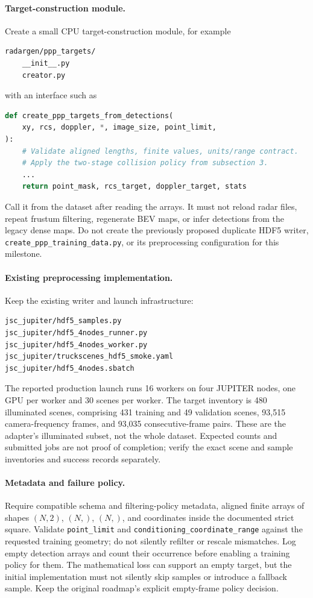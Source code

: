 \documentclass[11pt,a4paper]{article}
\begin{document}
\paragraph{Target-construction module.}
Create a small CPU target-construction module, for example
\begin{lstlisting}
radargen/ppp_targets/
    __init__.py
    creator.py
\end{lstlisting}
with an interface such as
\begin{lstlisting}[language=Python]
def create_ppp_targets_from_detections(
    xy, rcs, doppler, *, image_size, point_limit,
):
    # Validate aligned lengths, finite values, units/range contract.
    # Apply the two-stage collision policy from subsection 3.
    ...
    return point_mask, rcs_target, doppler_target, stats
\end{lstlisting}
Call it from the dataset after reading the arrays. It must not reload radar files, repeat frustum filtering, regenerate BEV maps, or infer detections from the legacy dense maps. Do not create the previously proposed duplicate HDF5 writer, \texttt{create\_ppp\_training\_data.py}, or its preprocessing configuration for this milestone.

\paragraph{Existing preprocessing implementation.}
Keep the existing writer and launch infrastructure:
\begin{lstlisting}
jsc_jupiter/hdf5_samples.py
jsc_jupiter/hdf5_4nodes_runner.py
jsc_jupiter/hdf5_4nodes_worker.py
jsc_jupiter/truckscenes_hdf5_smoke.yaml
jsc_jupiter/hdf5_4nodes.sbatch
\end{lstlisting}
The reported production launch runs 16 workers on four JUPITER nodes, one GPU per worker and 30 scenes per worker. The target inventory is 480 illuminated scenes, comprising 431 training and 49 validation scenes, 93,515 camera-frequency frames, and 93,035 consecutive-frame pairs. These are the adapter's illuminated subset, not the whole dataset. Expected counts and submitted jobs are not proof of completion; verify the exact scene and sample inventories and success records separately.

\paragraph{Metadata and failure policy.}
Require compatible schema and filtering-policy metadata, aligned finite arrays of shapes \((N,2)\), \((N,)\), \((N,)\), and coordinates inside the documented strict square. Validate \texttt{point\_limit} and \texttt{conditioning\_coordinate\_range} against the requested training geometry; do not silently refilter or rescale mismatches. Log empty detection arrays and count their occurrence before enabling a training policy for them. The mathematical loss can support an empty target, but the initial implementation must not silently skip samples or introduce a fallback sample. Keep the original roadmap's explicit empty-frame policy decision.
\end{document}
